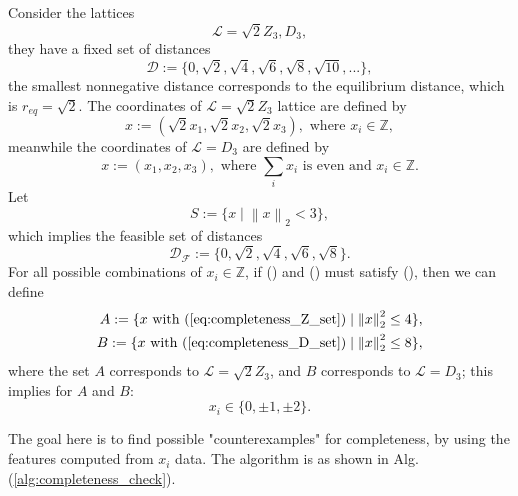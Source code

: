 \documentclass[12pt]{article}
\begin{document}
Consider the lattices
\begin{equation}
    \mathcal{L} = \sqrt{2}Z_3, D_3,
\end{equation}
they have a fixed set of distances
\begin{equation}
    \mathcal{D} := \{0, \sqrt{2}, \sqrt{4}, \sqrt{6}, \sqrt{8}, \sqrt{10}, ...\},
\end{equation}
the smallest nonnegative distance corresponds to the equilibrium distance, which is $r_{eq} = \sqrt{2}$. 
The coordinates of $\mathcal{L} = \sqrt{2}Z_3$ lattice are defined by
\begin{equation}
    x:= (\sqrt{2}x_1, \sqrt{2}x_2, \sqrt{2}x_3), \text{ where } x_i \in \mathbb{Z},
    \label{eq:completeness_Z_set}
\end{equation}
meanwhile the coordinates of $\mathcal{L} = D_3$ are defined by
\begin{equation}
    x:= (x_1, x_2, x_3), \text{ where } \sum_i x_i \text{ is even and } x_i \in \mathbb{Z}.
    \label{eq:completeness_D_set}
\end{equation}
Let
\begin{equation}
    S := \{x \mid \left\| x\right\|_2 < 3 \},
    \label{eq:completeness_distance_set}
\end{equation}
which implies the feasible set of distances
\begin{equation}
    \mathcal{D_F} := \{0, \sqrt{2}, \sqrt{4}, \sqrt{6}, \sqrt{8}\}.
\end{equation}
For all possible combinations of $x_i \in \mathbb{Z}$, if () and () must satisfy (), then we can define
\begin{equation}
    \begin{split}
        A:= \{ x \text{ with } (\refeq{eq:completeness_Z_set}) \mid \left\| x \right\|_2^2 \leq 4\}, \\
        B:= \{ x \text{ with } (\refeq{eq:completeness_D_set}) \mid \left\| x \right\|_2^2 \leq 8\},
    \end{split}
    \label{eq:completeness_lattice_set}
\end{equation}
where the set $A$ corresponds to $\mathcal{L} = \sqrt{2}Z_3$, and $B$ corresponds to $\mathcal{L} = D_3$; this implies for $A$ and $B$:
\begin{equation}
    x_i \in \{0, \pm 1, \pm 2\}.
\end{equation}

The goal here is to find possible "counterexamples" for completeness, by using the features computed from $x_i$ data. 
The algorithm is as shown in Alg.(\ref{alg:completeness_check}). 
\end{document}

